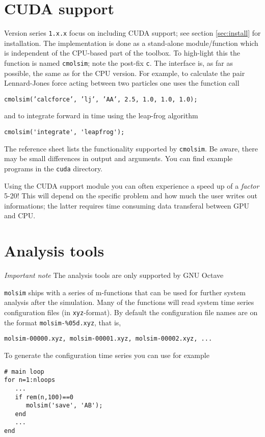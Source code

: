 \documentclass[11pt]{article}
\begin{document}
\section{CUDA support}
Version series \verb!1.x.x! focus on including CUDA support; see section \ref{sec:install} for installation. 
The implementation is done as a stand-alone module/function which is independent of the CPU-based part 
of the toolbox. To high-light this the function is named \verb!cmolsim!; note the post-fix \verb!c!. The interface 
is, as far as possible, the same as for the CPU version. For example, to calculate the pair Lennard-Jones 
force acting between two particles one uses the function call
\begin{verbatim}
cmolsim(’calcforce’, ’lj’, ’AA’, 2.5, 1.0, 1.0, 1.0);
\end{verbatim}
and to integrate forward in time using the leap-frog algorithm 
\begin{verbatim}
cmolsim('integrate', 'leapfrog');
\end{verbatim}
The reference sheet lists the functionality supported by \verb!cmolsim!. Be aware, there may be small differences in 
output and arguments. You can find example programs in the \verb!cuda! directory. 
\bigskip

\noindent Using the CUDA support module you can often experience a speed up of a \emph{factor} 5-20! This will depend
on the specific problem and how much the user writes out informations; the latter requires time consuming data 
transferal between GPU and CPU. 


\section{Analysis tools} 

\textit{Important note} The analysis tools are only supported by GNU Octave

\bigskip

\noindent \verb!molsim! ships with a series of m-functions that can be used for further system analysis after the 
simulation. Many of the functions will read system time series configuration files (in \verb!xyz!-format). 
By default the configuration file names are on the format \verb!molsim-%05d.xyz!, that is, 
\begin{verbatim}
molsim-00000.xyz, molsim-00001.xyz, molsim-00002.xyz, ...
\end{verbatim}
To generate the configuration time series you can use for example
\begin{verbatim}
# main loop
for n=1:nloops
   ...
   if rem(n,100)==0
      molsim('save', 'AB');
   end
   ...
end
\end{verbatim}
\end{document}
